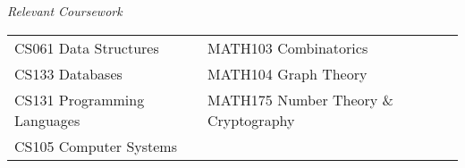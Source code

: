 {\it Relevant Coursework} \\
\begin{tabular}{l l}
CS061 Data Structures & MATH103 Combinatorics \\
CS133 Databases & MATH104 Graph Theory \\
CS131 Programming Languages & MATH175 Number Theory \& Cryptography \\
CS105 Computer Systems
\end{tabular}
